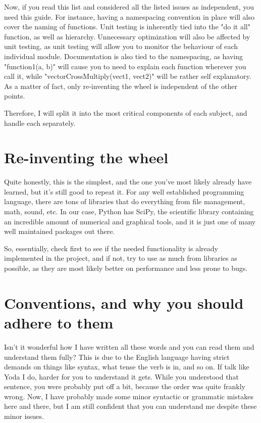 \documentclass[10pt,a4paper]{article}
\begin{document}
Now, if you read this list and considered all the listed issues as independent, you need this guide. For instance, having a namespacing convention in place will also cover the naming of functions. Unit testing is inherently tied into the "do it all" function, as well as hierarchy. Unnecessary optimization will also be affected by unit testing, as unit testing will allow you to monitor the behaviour of each individual module. Documentation is also tied to the namespacing, as having "function1(a, b)" will cause you to need to explain each function wherever you call it, while "vectorCrossMultiply(vect1, vect2)" will be rather self explanatory. As a matter of fact, only re-inventing the wheel is independent of the other points.

Therefore, I will split it into the most critical components of each subject, and handle each separately.

\newpage
\section{Re-inventing the wheel}
Quite honestly, this is the simplest, and the one you've most likely already have learned, but it's still good to repeat it. For any well established programming language, there are tons of libraries that do everything from file management, math, sound, etc. In our case, Python has SciPy, the scientific library containing an incredible amount of numerical and graphical tools, and it is just one of many well maintained packages out there. 

So, essentially, check first to see if the needed functionality is already implemented in the project, and if not, try to use as much from libraries as possible, as they are most likely better on performance and less prone to bugs.

\section{Conventions, and why you should adhere to them}
Isn't it wonderful how I have written all these words and you can read them and understand them fully? This is due to the English language having strict demands on things like syntax, what tense the verb is in, and so on. If talk like Yoda I do, harder for you to understand it gets. While you understood that sentence, you were probably put off a bit, because the order was quite frankly wrong. Now, I have probably made some minor syntactic or grammatic mistakes here and there, but I am still confident that you can understand me despite these minor issues. 
\end{document}
